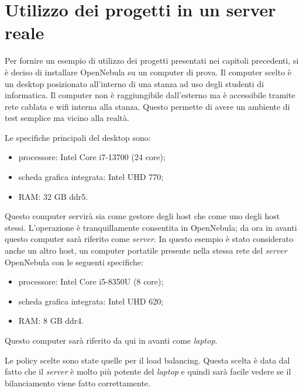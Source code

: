 
\chapter{Utilizzo dei progetti in un server reale}
\label{cap:capitolo4}
Per fornire un esempio di utilizzo dei progetti presentati nei capitoli precedenti, si è deciso di installare OpenNebula su un computer di prova. Il computer scelto è un desktop posizionato all'interno di una stanza ad uso degli studenti di informatica. Il computer non è raggiungibile dall'esterno ma è accessibile tramite rete cablata e wifi interna alla stanza. Questo permette di avere un ambiente di test semplice ma vicino alla realtà.\par
Le specifiche principali del desktop sono:
\begin{itemize}
    \item processore: Intel Core i7-13700 (24 core);
    \item scheda grafica integrata: Intel UHD 770;
    \item RAM: 32 GB ddr5.
\end{itemize}
Questo computer servirà sia come gestore degli host che come uno degli host stessi. L'operazione è tranquillamente consentita in OpenNebula; da ora in avanti questo computer sarà riferito come \emph{server}.
In questo esempio è stato considerato anche un altro host, un computer portatile presente nella stessa rete del \emph{server} OpenNebula con le seguenti specifiche:
\begin{itemize}
    \item processore: Intel Core i5-8350U (8 core);
    \item scheda grafica integrata: Intel UHD 620;
    \item RAM: 8 GB ddr4.
\end{itemize}
Questo computer sarà riferito da qui in avanti come \emph{laptop}.\par
Le policy scelte sono state quelle per il load balancing. Questa scelta è data dal fatto che il \emph{server} è molto più potente del \emph{laptop} e quindi sarà facile vedere se il bilanciamento viene fatto correttamente.

